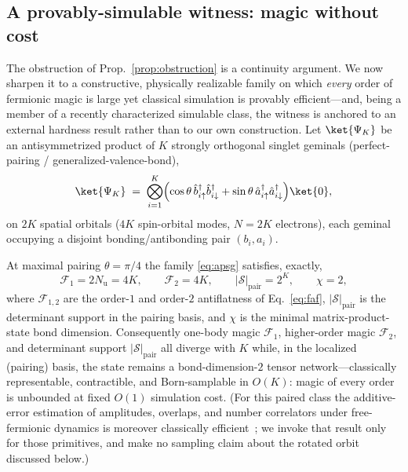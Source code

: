 \subsection{A provably-simulable witness: magic without cost}
\label{app:witness}
The obstruction of Prop.~\ref{prop:obstruction} is a continuity argument. We now sharpen it to a
constructive, physically realizable family on which \emph{every} order of fermionic magic is large yet
classical simulation is provably efficient---and, being a member of a recently characterized simulable
class, the witness is anchored to an external hardness result rather than to our own construction. Let
$\ket{\Psi_K}$ be an antisymmetrized product of $K$ strongly orthogonal singlet geminals
(perfect-pairing / generalized-valence-bond),
\begin{equation}
\ket{\Psi_K}\;=\;\bigotimes_{i=1}^{K}\Bigl(\cos\theta\,\hat b^{\dagger}_{i\uparrow}\hat b^{\dagger}_{i\downarrow}
+\sin\theta\,\hat a^{\dagger}_{i\uparrow}\hat a^{\dagger}_{i\downarrow}\Bigr)\ket{0},
\label{eq:apsg}
\end{equation}
on $2K$ spatial orbitals ($4K$ spin-orbital modes, $N=2K$ electrons), each geminal occupying a disjoint
bonding/antibonding pair $(b_i,a_i)$.

\begin{theorem}\label{thm:witness}
At maximal pairing $\theta=\pi/4$ the family \eqref{eq:apsg} satisfies, exactly,
\begin{equation}
\mathcal F_1=2N_{\mathrm u}=4K,\qquad \mathcal F_2=4K,\qquad
|\mathcal S|_{\mathrm{pair}}=2^{K},\qquad \chi=2,
\end{equation}
where $\mathcal F_{1,2}$ are the order-$1$ and order-$2$ antiflatness of Eq.~\eqref{eq:faf},
$|\mathcal S|_{\mathrm{pair}}$ is the determinant support in the pairing basis, and $\chi$ is the minimal
matrix-product-state bond dimension. Consequently one-body magic $\mathcal F_1$, higher-order magic
$\mathcal F_2$, and determinant support $|\mathcal S|_{\mathrm{pair}}$ all diverge with $K$ while, in the
localized (pairing) basis, the state remains a bond-dimension-$2$ tensor network---classically
representable, contractible, and Born-samplable in $O(K)$: magic of every order is unbounded at fixed
$O(1)$ simulation cost. (For this paired class the additive-error estimation of amplitudes, overlaps, and
number correlators under free-fermionic dynamics is moreover classically efficient~\cite{oh2026}; we
invoke that result only for those primitives, and make no sampling claim about the rotated orbit
discussed below.)
\end{theorem}

